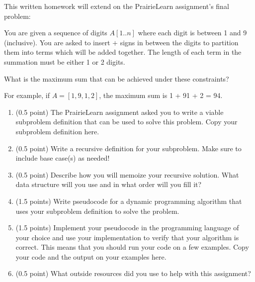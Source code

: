 \documentclass[11pt]{article}
\begin{document}
\newpage



This written homework will extend on the PrairieLearn assignment's final problem:

You are given a sequence of digits $A[1..n]$ where each digit is between 1 and 9
(inclusive). You are asked to insert $+$ signs in between the digits to partition them
into terms which will be added together. The length of each term in the summation
must be either 1 or 2 digits.

What is the maximum sum that can be achieved under these constraints?

For example, if $A=[1,9,1,2]$, the maximum sum is 1 + 91 + 2 = 94.

\begin{enumerate}

\item (0.5 point) The PrairieLearn assignment asked you to write a viable subproblem definition
that can be used to solve this problem. Copy your subproblem definition here.

\item (0.5 point) Write a recursive definition for your subproblem. Make sure to include base case(s) as needed!

\item (0.5 point) Describe how you will memoize your recursive solution. What data structure will you use and
in what order will you fill it?

\item (1.5 points) Write pseudocode for a dynamic programming algorithm that uses your
subproblem definition to solve the problem.

\item (1.5 points) Implement your pseudocode in the programming language of your choice and use your implementation to
verify that your algorithm is correct. This means that you should run your code on a few examples.
Copy your code and the output on your examples here.

\item (0.5 point) What outside resources did you use to help with this assignment?

\end{enumerate}
    
\end{document}
